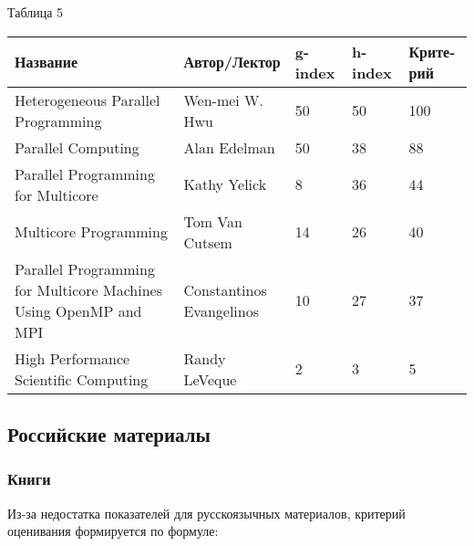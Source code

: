 \documentclass{article}
\begin{document}
	\begin{flushleft}
				Таблица 5
				\begin{longtable}{|p{5.5cm}|p{5cm}|p{1.55cm}|p{1.55cm}|p{1.7cm}|}
\hline
Название & Автор/Лектор & g-index & h-index & Крите-рий \\\hline

Heterogeneous Parallel Programming &
Wen-mei W. Hwu & 50 & 50 & 100\\\hline

Parallel Computing &
Alan Edelman & 50 & 38 & 88\\\hline

Parallel Programming for Multicore &
Kathy Yelick & 8 & 36 & 44\\\hline

Multicore Programming &
Tom Van Cutsem & 14 & 26 & 40\\\hline

Parallel Programming for Multicore Machines Using OpenMP and MPI &
Constantinos Evangelinos & 10 & 27 & 37\\\hline

High Performance Scientific Computing &
Randy LeVeque & 2 & 3 & 5\\\hline
				\end{longtable}
			\end{flushleft}
\newpage

	\subsection{Российские материалы}
		\subsubsection{Книги}
		Из-за недостатка показателей для русскоязычных материалов, критерий оценивания формируется по формуле:
			
\end{document}
